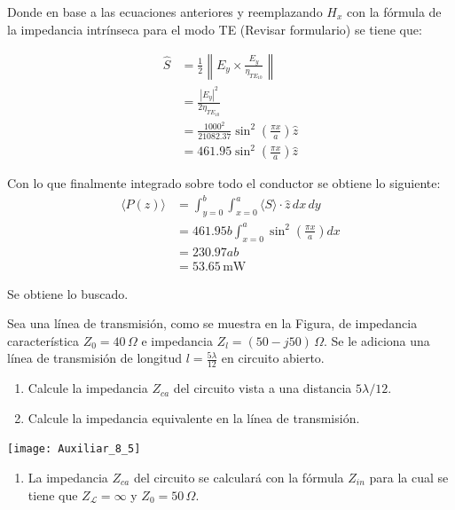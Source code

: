 \documentclass[
  11pt,
  letterpaper,
   addpoints,
   answers
  ]{exam}
\begin{document}
\begin{questions}
\begin{solution}
Donde en base a las ecuaciones anteriores y reemplazando $H_x$ con la fórmula de la impedancia intrínseca para el modo TE (Revisar formulario) se tiene que:

\begin{align}
    \hat{S} &= \frac{1}{2} \left\| E_y \times \frac{E_y}{\eta_{TE_{10}}} \right\| \tag{105} \\
            &= \frac{|E_y|^2}{2 \eta_{TE_{10}}} \tag{106} \\
            &= \frac{1000^2}{21082.37} \sin^2 \left( \frac{\pi x}{a} \right) \hat{z} \tag{107} \\
            &= 461.95 \sin^2 \left( \frac{\pi x}{a} \right) \hat{z} \tag{108}
\end{align}

Con lo que finalmente integrado sobre todo el conductor se obtiene lo siguiente:
\begin{align}
    \langle P(z) \rangle &= \int_{y=0}^b \int_{x=0}^a \langle S \rangle \cdot \hat{z}\, dx\,dy \tag{109} \\
    &= 461.95 b \int_{x=0}^a \sin^2 \left( \frac{\pi x}{a} \right) dx \tag{110} \\
    &= 230.97 ab \tag{111} \\
    &= 53.65\,\text{mW} \tag{112}
\end{align}

Se obtiene lo buscado.

\end{solution}
\question Sea una línea de transmisión, como se muestra en la Figura, de impedancia característica $Z_0 = 40\,\Omega$ e impedancia $Z_l = (50 - j50)\,\Omega$. Se le adiciona una línea de transmisión de longitud $l = \frac{5\lambda}{12}$ en circuito abierto.

\begin{enumerate}
    \item Calcule la impedancia $Z_{ca}$ del circuito vista a una distancia $5\lambda/12$.
    \item Calcule la impedancia equivalente en la línea de transmisión.
\end{enumerate}
\begin{center}
    \texttt{[image: Auxiliar\_8\_5]}
\end{center}
\begin{solution}
    \begin{enumerate}
    \item La impedancia $Z_{ca}$ del circuito se calculará con la fórmula $Z_{in}$ para la cual se tiene que $Z_\mathcal{L} = \infty$ y $Z_0 = 50\,\Omega$.
    

\end{enumerate}
\end{solution}
\end{questions}
\end{document}
